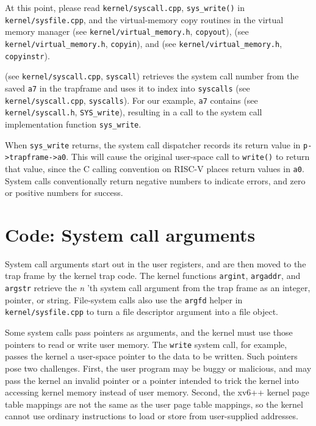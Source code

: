 At this point, please read {\tt kernel/syscall.cpp},
{\tt sys\_write()} in {\tt kernel/sysfile.cpp},
and the virtual-memory copy routines in the virtual memory manager
(see \texttt{kernel/virtual\_memory.h}, \texttt{copyout}),
(see \texttt{kernel/virtual\_memory.h}, \texttt{copyin}), and
(see \texttt{kernel/virtual\_memory.h}, \texttt{copyinstr}).

(see \texttt{kernel/syscall.cpp}, \texttt{syscall})
retrieves the system call number from the saved
\texttt{a7} in the trapframe
and uses it to index into {\tt syscalls}
(see \texttt{kernel/syscall.cpp}, \texttt{syscalls}).
For our example,
\texttt{a7}
contains
(see \texttt{kernel/syscall.h}, \texttt{SYS\_write}),
resulting in a call to the system call implementation function
\lstinline{sys_write}.

When \lstinline{sys_write} returns,
the system call dispatcher
records its return value in
\lstinline{p->trapframe->a0}.
This will cause the original user-space call to
{\tt write()} to return that value, since the C
calling convention on RISC-V places return values in {\tt a0}.
System calls conventionally return negative numbers to indicate
errors, and zero or positive numbers for success.

\section{Code: System call arguments}

System call arguments start out in the user registers, and
are then moved to the trap frame by the kernel trap code.
The kernel functions
\lstinline{argint},
\lstinline{argaddr},
and
\lstinline{argstr}
retrieve the
\textit{n} 'th
system call argument
from the trap frame
as an integer, pointer, or string. File-system calls also use the
\lstinline{argfd} helper in \texttt{kernel/sysfile.cpp} to turn a file
descriptor argument into a file object.

Some system calls pass pointers as arguments, and the kernel must use
those pointers to read or write user memory. The {\tt write} system
call, for example, passes the kernel a user-space pointer
to the data to be written.
Such pointers pose
two challenges. First, the user program may be buggy or malicious, and
may pass the kernel an invalid pointer or a pointer intended to trick
the kernel into accessing kernel memory instead of user memory.
Second, the xv6++ kernel page table mappings are not the same as the
user page table mappings, so the kernel cannot use ordinary
instructions to load or store from user-supplied addresses.

